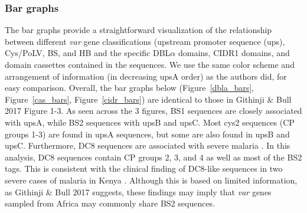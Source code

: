 \documentclass[10pt,twocolumn,superscriptaddress]{revtex4-1}
\newcommand{\var}{{\it var}\xspace}
\newcommand{\dbla}{{DBL$\alpha$}\xspace}
\newcommand{\cidra}{{CIDR$\alpha$}\xspace}
\newcommand{\cp}{{Cys/PoLV}\xspace}
\newcommand{\paper}{{Githinji \& Bull 2017}\xspace}
\newcommand{\figdir}{figures/}
\begin{document}
\subsubsection{Bar graphs}
The bar graphs provide a straightforward visualization of the relationship between different \var gene classifications (upstream promoter sequence (ups), \cp, BS, and HB and the specific \dbla domains, CIDR1 domains, and domain cassettes contained in the sequences. We use the same color scheme and arrangement of information (in decreasing upsA order) as the authors did, for easy comparison. Overall, the bar graphs below (Figure~\ref{dbla_bars}, Figure~\ref{cas_bars}, Figure~\ref{cidr_bars}) are identical to those in \paper Figure 1-3. As seen across the 3 figures, BS1 sequences are closely associated with upsA, while BS2 sequences with upsB and upsC. Most cys2 sequences (CP groups 1-3) are found in upsA sequences, but some are also found in upsB and upsC. Furthermore, DC8 sequences are associated with severe malaria \cite{lavstsen2012} \cite{rask2010}. In this analysis, DC8 sequences contain CP groups 2, 3, and 4 as well as most of the BS2 tags. This is consistent with the clinical finding of DC8-like sequences in two severe cases of malaria in Kenya \cite{bull2005}. Although this is based on limited information, as \paper suggests, these findings may imply that \var genes sampled from Africa may commonly share BS2 sequences. 

\end{document}
